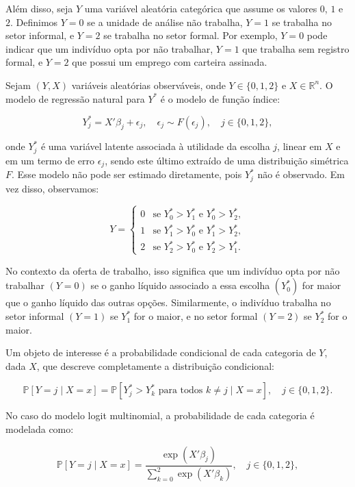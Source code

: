 \documentclass[12pt, a4paper, openany]{book}
\numberwithin{equation}{chapter}
\numberwithin{table}{chapter}
\numberwithin{figure}{chapter}
\theoremstyle{break}
\begin{document}
Além disso, seja \( Y \) uma variável aleatória categórica que assume os valores \( 0 \), \( 1 \) e \( 2 \). Definimos \( Y = 0 \) se a unidade de análise não trabalha, \( Y = 1 \) se trabalha no setor informal, e \( Y = 2 \) se trabalha no setor formal. Por exemplo, \( Y = 0 \) pode indicar que um indivíduo opta por não trabalhar, \( Y = 1 \) que trabalha sem registro formal, e \( Y = 2 \) que possui um emprego com carteira assinada.

Sejam \( (Y, X) \) variáveis aleatórias observáveis, onde \( Y \in \{0, 1, 2\} \) e \( X \in \mathbb{R}^n \). O modelo de regressão natural para \( Y^* \) é o modelo de função índice:

\[
Y^*_j = X'\beta_j + \epsilon_j, \quad \epsilon_j \sim F(\epsilon_j), \quad j \in \{0, 1, 2\},
\]

onde \( Y^*_j \) é uma variável latente associada à utilidade da escolha \( j \), linear em \( X \) e em um termo de erro \( \epsilon_j \), sendo este último extraído de uma distribuição simétrica \( F \). Esse modelo não pode ser estimado diretamente, pois \( Y^*_j \) não é observado. Em vez disso, observamos:

\[
Y = 
\begin{cases}
0 & \text{se } Y^*_0 > Y^*_1 \text{ e } Y^*_0 > Y^*_2, \\
1 & \text{se } Y^*_1 > Y^*_0 \text{ e } Y^*_1 > Y^*_2, \\
2 & \text{se } Y^*_2 > Y^*_0 \text{ e } Y^*_2 > Y^*_1.
\end{cases}
\]

No contexto da oferta de trabalho, isso significa que um indivíduo opta por não trabalhar \( (Y = 0) \) se o ganho líquido associado a essa escolha \( (Y^*_0) \) for maior que o ganho líquido das outras opções. Similarmente, o indivíduo trabalha no setor informal \( (Y = 1) \) se \( Y^*_1 \) for o maior, e no setor formal \( (Y = 2) \) se \( Y^*_2 \) for o maior.

Um objeto de interesse é a probabilidade condicional de cada categoria de \( Y \), dada \( X \), que descreve completamente a distribuição condicional:

\[
\mathbb{P}[Y = j \mid X = x] = \mathbb{P}[Y^*_j > Y^*_{k} \text{ para todos } k \neq j \mid X = x], \quad j \in \{0, 1, 2\}.
\]

No caso do modelo logit multinomial, a probabilidade de cada categoria é modelada como:

\[
\mathbb{P}[Y = j \mid X = x] = \frac{\exp(X'\beta_j)}{\sum_{k=0}^{2} \exp(X'\beta_k)}, \quad j \in \{0, 1, 2\},
\]
\end{document}
